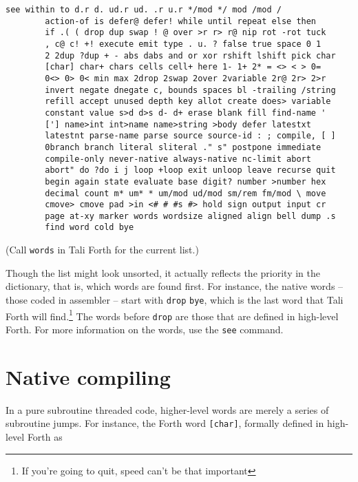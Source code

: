 \begin{lstlisting}[frame=lines]
        see within to d.r d. ud.r ud. .r u.r */mod */ mod /mod /
        action-of is defer@ defer! while until repeat else then
        if .( ( drop dup swap ! @ over >r r> r@ nip rot -rot tuck
        , c@ c! +! execute emit type . u. ? false true space 0 1
        2 2dup ?dup + - abs dabs and or xor rshift lshift pick char
        [char] char+ chars cells cell+ here 1- 1+ 2* = <> < > 0=
        0<> 0> 0< min max 2drop 2swap 2over 2variable 2r@ 2r> 2>r
        invert negate dnegate c, bounds spaces bl -trailing /string
        refill accept unused depth key allot create does> variable
        constant value s>d d>s d- d+ erase blank fill find-name '
        ['] name>int int>name name>string >body defer latestxt
        latestnt parse-name parse source source-id : ; compile, [ ]
        0branch branch literal sliteral ." s" postpone immediate
        compile-only never-native always-native nc-limit abort
        abort" do ?do i j loop +loop exit unloop leave recurse quit
        begin again state evaluate base digit? number >number hex
        decimal count m* um* * um/mod ud/mod sm/rem fm/mod \ move
        cmove> cmove pad >in <# # #s #> hold sign output input cr
        page at-xy marker words wordsize aligned align bell dump .s
        find word cold bye
\end{lstlisting}

\noindent (Call \texttt{words} in Tali Forth for the
current list.)

Though the list might look unsorted, it actually reflects the priority in the
dictionary, that is, which words are found first. For
instance, the native words -- those coded in assembler --
start with \texttt{drop}
\texttt{bye}, which is the last word that Tali Forth
will find.\footnote{If you're going to quit, speed can't be that important} The
words before \texttt{drop} are those that are defined in high-level Forth. For
more information on the words, use the \texttt{see}
command.

\section{Native compiling}

In a pure subroutine threaded code, higher-level words are merely a series of
subroutine jumps. For instance, the Forth word
\texttt{[char]}, formally defined in high-level
Forth as

